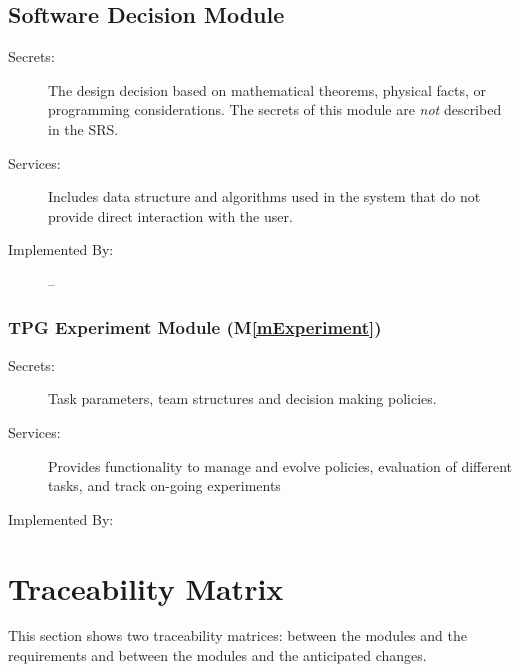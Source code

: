 \documentclass[12pt, titlepage]{article}
\newcommand{\mref}[1]{M\ref{#1}}
\begin{document}
\subsection{Software Decision Module}

\begin{description}
\item[Secrets:] The design decision based on mathematical theorems, physical
  facts, or programming considerations. The secrets of this module are
  \emph{not} described in the SRS.
\item[Services:] Includes data structure and algorithms used in the system that
  do not provide direct interaction with the user. 
\item[Implemented By:] --
\end{description}

\subsubsection{TPG Experiment Module (\mref{mExperiment})}
\begin{description}
  \item[Secrets:] Task parameters, team structures and decision making policies.
  \item[Services:] Provides functionality to manage and evolve policies, evaluation of different tasks, and track on-going experiments
  \item[Implemented By:] \progname{}
  \end{description}

\section{Traceability Matrix} \label{SecTM}

This section shows two traceability matrices: between the modules and the
requirements and between the modules and the anticipated changes.
\end{document}
